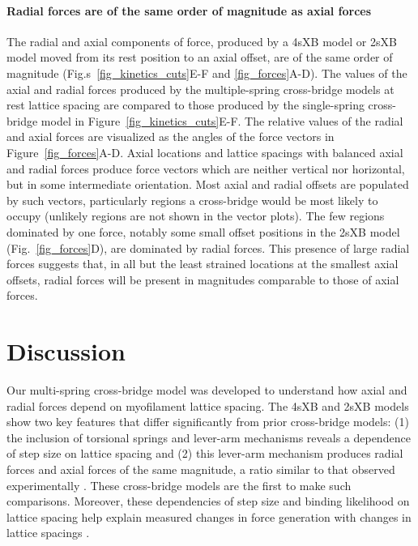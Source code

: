 \documentclass[11pt,titlepage]{article}
\begin{document}
\paragraph{Radial forces are of the same order of magnitude as axial forces} %
The radial and axial components of force, produced by a 4sXB model or 2sXB model moved from its rest position to an axial offset, are of the same order of magnitude (Fig.s~\ref{fig_kinetics_cuts}E-F and \ref{fig_forces}A-D). 
The values of the axial and radial forces produced by the multiple-spring cross-bridge models at rest lattice spacing are compared to those produced by the single-spring cross-bridge model in Figure~\ref{fig_kinetics_cuts}E-F.
The relative values of the radial and axial forces are visualized as the angles of the force vectors in Figure~\ref{fig_forces}A-D. 
Axial locations and lattice spacings with balanced axial and radial forces produce force vectors which are neither vertical nor horizontal, but in some intermediate orientation.
Most axial and radial offsets are populated by such vectors, particularly regions a cross-bridge would be most likely to occupy (unlikely regions are not shown in the vector plots). 
The few regions dominated by one force, notably some small offset positions in the 2sXB model (Fig.~\ref{fig_forces}D), are dominated by radial forces.
This presence of large radial forces suggests that, in all but the least strained locations at the smallest axial offsets, radial forces will be present in magnitudes comparable to those of axial forces. 



\section*{Discussion} %

Our multi-spring cross-bridge model was developed to understand how axial and radial forces depend on myofilament lattice spacing.
The 4sXB and 2sXB models show two key features that differ significantly from prior cross-bridge models: (1) the inclusion of torsional springs and lever-arm mechanisms reveals a dependence of step size on lattice spacing and (2) this lever-arm mechanism produces radial forces and axial forces of the same magnitude, a ratio similar to that observed experimentally \citep{Maughan1981, Cecchi1990, Brenner1991}. 
These cross-bridge models are the first to make such comparisons.
Moreover, these dependencies of step size and binding likelihood on lattice spacing help explain measured changes in force generation with changes in lattice spacings  \citep{Millman1998}. 
\end{document}
